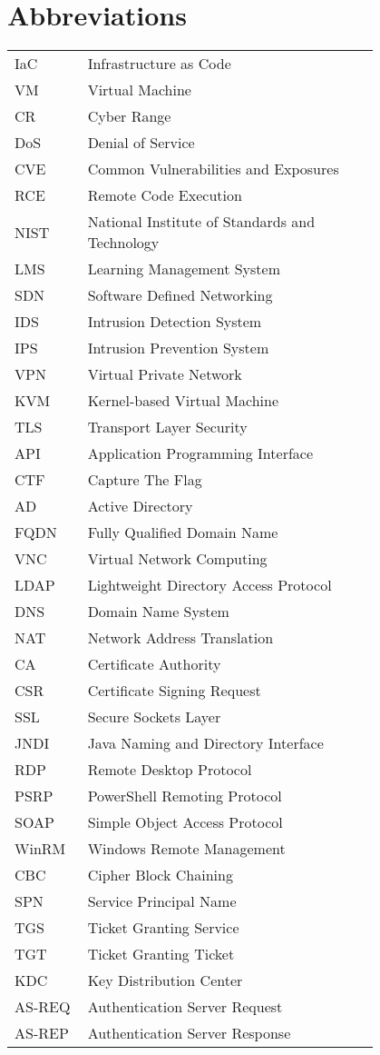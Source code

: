 \chapter*{Abbreviations}

\begin{flushleft}
\begin{tabular}{l p{0.8\linewidth}}
IaC      & Infrastructure as Code\\
VM       & Virtual Machine\\
CR       & Cyber Range\\
DoS      & Denial of Service\\
CVE      & Common Vulnerabilities and Exposures\\
RCE      & Remote Code Execution\\
NIST     & National Institute of Standards and Technology\\
LMS      & Learning Management System\\
SDN      & Software Defined Networking\\
IDS      & Intrusion Detection System\\
IPS      & Intrusion Prevention System\\
VPN      & Virtual Private Network\\
KVM      & Kernel-based Virtual Machine\\
TLS      & Transport Layer Security\\
API      & Application Programming Interface\\
CTF      & Capture The Flag\\
AD       & Active Directory\\
FQDN     & Fully Qualified Domain Name\\
VNC      & Virtual Network Computing\\
LDAP     & Lightweight Directory Access Protocol\\
DNS      & Domain Name System\\
NAT      & Network Address Translation\\
CA       & Certificate Authority\\
CSR      & Certificate Signing Request\\
SSL      & Secure Sockets Layer\\
JNDI     & Java Naming and Directory Interface\\
RDP      & Remote Desktop Protocol\\
PSRP     & PowerShell Remoting Protocol\\
SOAP     & Simple Object Access Protocol\\
WinRM    & Windows Remote Management\\
CBC      & Cipher Block Chaining\\
SPN      & Service Principal Name\\
TGS      & Ticket Granting Service\\
TGT      & Ticket Granting Ticket\\
KDC      & Key Distribution Center\\
AS-REQ   & Authentication Server Request\\
AS-REP   & Authentication Server Response\\
\end{tabular}
\end{flushleft}